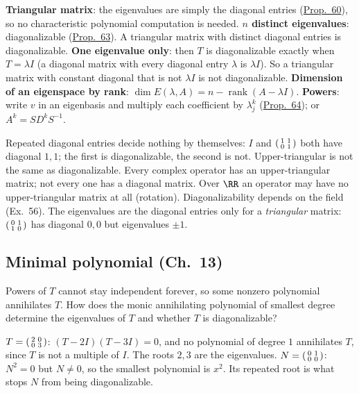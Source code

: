 \documentclass[10pt]{scrartcl}
\begin{document}
\begin{shortcuts}
  \ii \textbf{Triangular matrix}: the eigenvalues are simply the diagonal entries (\hyperref[prop-60]{Prop.~60}), so no characteristic polynomial computation is needed.
  \ii \textbf{$n$ distinct eigenvalues}: diagonalizable (\hyperref[prop-63]{Prop.~63}). A triangular matrix with distinct diagonal entries is diagonalizable.
  \ii \textbf{One eigenvalue only}: then $T$ is diagonalizable exactly when $T=\lambda I$ (a diagonal matrix with every diagonal entry $\lambda$ is $\lambda I$). So a triangular matrix with constant diagonal that is not $\lambda I$ is not diagonalizable.
  \ii \textbf{Dimension of an eigenspace by rank}: $\dim E(\lambda,A)=n-\operatorname{rank}(A-\lambda I)$.
  \ii \textbf{Powers}: write $v$ in an eigenbasis and multiply each coefficient by $\lambda_j^k$ (\hyperref[prop-64]{Prop.~64}); or $A^k=SD^kS^{-1}$.
\end{shortcuts}
\begin{trapbox}
  \ii Repeated diagonal entries decide nothing by themselves: $I$ and $\begin{psmallmatrix}1&1\\0&1\end{psmallmatrix}$ both have diagonal $1,1$; the first is diagonalizable, the second is not.
  \ii Upper-triangular is not the same as diagonalizable. Every complex operator has an upper-triangular matrix; not every one has a diagonal matrix.
  \ii Over $\RR$ an operator may have no upper-triangular matrix at all (rotation).
  \ii Diagonalizability depends on the field (Ex.~56).
  \ii The eigenvalues are the diagonal entries only for a \emph{triangular} matrix: $\begin{psmallmatrix}0&1\\1&0\end{psmallmatrix}$ has diagonal $0,0$ but eigenvalues $\pm1$.
\end{trapbox}



\subsection{Minimal polynomial (Ch.~13)}

\begin{qbox}
  Powers of $T$ cannot stay independent forever, so some nonzero polynomial annihilates $T$. How does the monic annihilating polynomial of smallest degree determine the eigenvalues of $T$ and whether $T$ is diagonalizable?
  \begin{itemize}
    \ii $T=\begin{psmallmatrix}2&0\\0&3\end{psmallmatrix}$: $(T-2I)(T-3I)=0$, and no polynomial of degree $1$ annihilates $T$, since $T$ is not a multiple of $I$. The roots $2,3$ are the eigenvalues.
    \ii $N=\begin{psmallmatrix}0&1\\0&0\end{psmallmatrix}$: $N^2=0$ but $N\ne0$, so the smallest polynomial is $x^2$. Its repeated root is what stops $N$ from being diagonalizable.
  \end{itemize}
\end{qbox}
\end{document}
